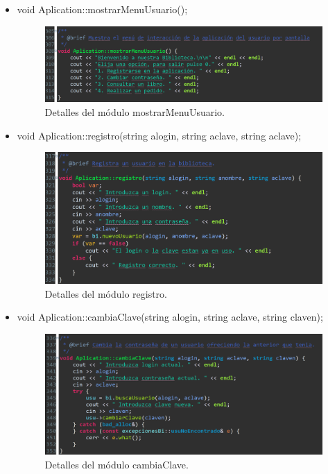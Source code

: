 		\begin{itemize}
			\item void Aplication::mostrarMenuUsuario();
			
			\begin{figure}[H]
				\centering
				\includegraphics[scale=0.9]{img/estebanFinal4.png}
				\caption{Detalles del módulo mostrarMenuUsuario.}
				\label{estebanFinal4}
			\end{figure}
		
			\item void Aplication::registro(string alogin, string aclave, string aclave);
			
			\begin{figure}[H]
				\centering
				\includegraphics[scale=0.9]{img/estebanFinal5.png}
				\caption{Detalles del módulo registro.}
				\label{estebanFinal5}
			\end{figure}
		
			\item void Aplication::cambiaClave(string alogin, string aclave, string claven);
			
			\begin{figure}[H]
				\centering
				\includegraphics[scale=0.9]{img/estebanFinal6.png}
				\caption{Detalles del módulo cambiaClave.}
				\label{estebanFinal6}
			\end{figure}
		

\end{itemize}

